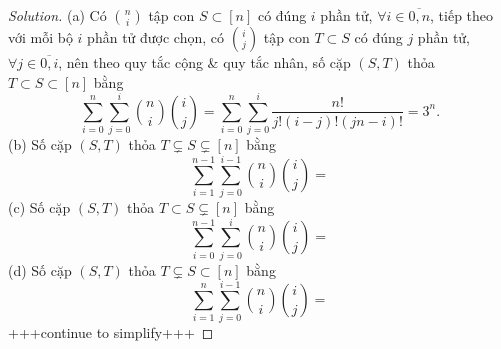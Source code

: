 \documentclass{article}
\begin{document}
\begin{proof}[Solution]
    (a) Có $\binom{n}{i}$ tập con $S\subset[n]$ có đúng $i$ phần tử, $\forall i\in\overline{0,n}$, tiếp theo với mỗi bộ $i$ phần tử được chọn, có $\binom{i}{j}$ tập con $T\subset S$ có đúng $j$ phần tử, $\forall j\in\overline{0,i}$, nên theo quy tắc cộng \& quy tắc nhân, số cặp $(S,T)$ thỏa $T\subset S\subset[n]$ bằng
    \begin{equation*}
        \sum_{i=0}^n\sum_{j=0}^i \binom{n}{i}\binom{i}{j} = \sum_{i=0}^n\sum_{j=0}^i \frac{n!}{j!(i - j)!(jn - i)!} = 3^n.
    \end{equation*}
    (b) Số cặp $(S,T)$ thỏa $T\subsetneq S\subsetneq[n]$ bằng
    \begin{equation*}
        \sum_{i=1}^{n-1}\sum_{j=0}^{i-1} \binom{n}{i}\binom{i}{j} =
    \end{equation*}
    (c) Số cặp $(S,T)$ thỏa $T\subset S\subsetneq[n]$ bằng
    \begin{equation*}
        \sum_{i=0}^{n-1}\sum_{j=0}^i \binom{n}{i}\binom{i}{j} =
    \end{equation*}
    (d) Số cặp $(S,T)$ thỏa $T\subsetneq S\subset[n]$ bằng
    \begin{equation*}
        \sum_{i=1}^n\sum_{j=0}^{i-1} \binom{n}{i}\binom{i}{j} =
    \end{equation*}
    +++continue to simplify+++
\end{proof}
\end{document}
